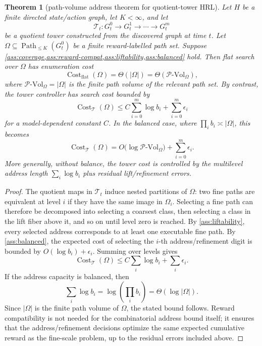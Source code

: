 \documentclass[11pt]{article}
\newtheorem{theorem}[definition]{Theorem}
\newcommand{\Path}{\operatorname{Path}}
\newcommand{\PVol}{\mathcal{P}\text{-}\mathrm{Vol}}
\newcommand{\cost}{\operatorname{Cost}}
\begin{document}
\begin{theorem}[path-volume address theorem for quotient-tower HRL]\label{thm:path-volume-address}
Let \(H\) be a finite directed state/action graph, let \(K<\infty\), and let
\[
    \mathcal{T}_t:G^0_t\to G^1_t\to\cdots\to G^m_t
\]
be a quotient tower constructed from the discovered graph at time \(t\).  Let \(\Omega\subseteq\Path_{\le K}(G^0_t)\) be a finite reward-labelled path set.  Suppose \cref{ass:coverage,ass:reward-compat,ass:liftability,ass:balanced} hold.  Then flat search over \(\Omega\) has enumeration cost
\[
    \cost_{\mathrm{flat}}(\Omega)=\Theta(|\Omega|)=\Theta(\PVol_{\Omega}),
\]
where \(\PVol_{\Omega}=|\Omega|\) is the finite path volume of the relevant path set.  By contrast, the tower controller has search cost bounded by
\[
    \cost_{\mathcal{T}}(\Omega)
    \le C\sum_{i=0}^{m}\log b_i + \sum_{i=0}^{m}\epsilon_i
\]
for a model-dependent constant \(C\).  In the balanced case, where \(\prod_i b_i\asymp |\Omega|\), this becomes
\[
    \cost_{\mathcal{T}}(\Omega)
    =O\bigl(\log \PVol_{\Omega}\bigr)+\sum_{i=0}^{m}\epsilon_i.
\]
More generally, without balance, the tower cost is controlled by the multilevel address length \(\sum_i\log b_i\) plus residual lift/refinement errors.
\end{theorem}

\begin{proof}
The quotient maps in \(\mathcal{T}_t\) induce nested partitions of \(\Omega\): two fine paths are equivalent at level \(i\) if they have the same image in \(\Omega_i\).  Selecting a fine path can therefore be decomposed into selecting a coarsest class, then selecting a class in the lift fiber above it, and so on until level zero is reached.  By \cref{ass:liftability}, every selected address corresponds to at least one executable fine path.  By \cref{ass:balanced}, the expected cost of selecting the \(i\)-th address/refinement digit is bounded by \(O(\log b_i)+\epsilon_i\).  Summing over levels gives
\[
    \cost_{\mathcal{T}}(\Omega)
    \le C\sum_i\log b_i+
    \sum_i\epsilon_i.
\]
If the address capacity is balanced, then
\[
    \sum_i\log b_i=\log\left(\prod_i b_i\right)=\Theta(\log |\Omega|).
\]
Since \(|\Omega|\) is the finite path volume of \(\Omega\), the stated bound follows.  Reward compatibility is not needed for the combinatorial address bound itself; it ensures that the address/refinement decisions optimize the same expected cumulative reward as the fine-scale problem, up to the residual errors included above.
\end{proof}
\end{document}
